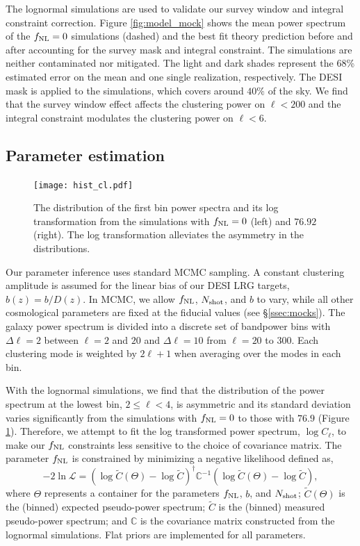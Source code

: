 The lognormal simulations are used to validate our survey window and integral constraint correction. Figure \ref{fig:model_mock} shows the mean power spectrum of the $f_{\rm NL}=0$ simulations (dashed) and the best fit theory prediction before and after accounting for the survey mask and integral constraint. The simulations are neither contaminated nor mitigated. The light and dark shades represent the 68\% estimated error on the mean and one single realization, respectively. The DESI mask is applied to the simulations, which covers around $40\%$ of the sky. We find that the survey window effect affects the clustering power on $\ell < 200$ and the integral constraint modulates the clustering power on $\ell < 6$.

\subsection{Parameter estimation}

\begin{figure}
\centering
\texttt{[image: hist\_cl.pdf]}
\caption{The distribution of the first bin power spectra and its log transformation from the simulations with $f_{\rm NL}=0$ (left) and $76.92$ (right). The log transformation alleviates the asymmetry in the distributions.}\label{fig:histcell}
\end{figure}

Our parameter inference uses standard MCMC sampling. A constant clustering amplitude is assumed for the linear bias of our DESI LRG targets, $b(z) = b/D(z)$. In MCMC, we allow $f_{\rm NL}$, $N_{\rm shot}$, and $b$ to vary, while all other cosmological parameters are fixed at the fiducial values (see \S \ref{ssec:mocks}). The galaxy power spectrum is divided into a discrete set of bandpower bins with $\Delta\ell=2$ between $\ell=2$ and $20$ and $\Delta \ell=10$ from $\ell=20$ to $300$. Each clustering mode is weighted by $2\ell+1$ when averaging over the modes in each bin.

With the lognormal simulations, we find that the distribution of the power spectrum at the lowest bin, $2\leq \ell < 4$, is asymmetric and its standard deviation varies significantly from the simulations with $f_{\rm NL}=0$ to those with $76.9$ (Figure \ref{fig:histcell}). Therefore, we attempt to fit the log transformed power spectrum, $\log C_{\ell}$, to make our $f_{\rm NL}$ constraints less sensitive to the choice of covariance matrix. The parameter $f_{\rm NL}$ is constrained by minimizing a negative likelihood defined as,
\begin{equation}
-2\ln\mathcal{L} = (\log \tilde{C}(\Theta)-\log \tilde{C})^{\dagger} \mathbb{C}^{-1} (\log \tilde{C}(\Theta)-\log \tilde{C}),
\end{equation}
where $\Theta$ represents a container for the parameters $f_{\rm NL}$, $b$, and $N_{\rm shot}$; $\tilde{C}(\Theta)$ is the (binned) expected pseudo-power spectrum; $\tilde{C}$ is the (binned) measured pseudo-power spectrum; and $\mathbb{C}$ is the covariance matrix constructed from the lognormal simulations. Flat priors are implemented for all parameters.


